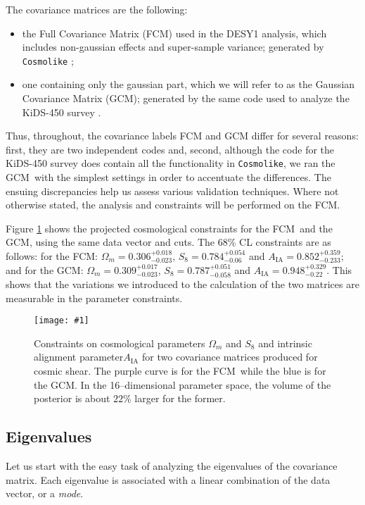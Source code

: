 \documentclass[twocolumn,nofootinbib]{\docclass}
\newcommand{\sfig}[2]{
	\texttt{[image: \#1]}
}
\newcommand{\Sfig}[3]{
	\begin{figure}[#1]
		\sfig{../figures/#2.pdf}{\columnwidth}
		\caption{#3}
		\label{fig:#2}
	\end{figure}
}
\newcommand{\rf}[1]{Figure \ref{fig:#1}}
\newcommand\full{the FCM}
\newcommand\gaussian{the GCM}
\begin{document}
The covariance matrices are the following:
\begin{itemize}
	\item the Full Covariance Matrix (FCM) used in the DESY1 analysis, which includes non-gaussian effects and super-sample variance; generated by \texttt{Cosmolike} \cite{Krause:2016jvl};
	\item one containing only the gaussian part, which we will refer to as the Gaussian Covariance Matrix (GCM); generated by the same code used to analyze the KiDS-450 survey \cite{Kohlinger:2017sxk, Joachimi:2020blm}.
\end{itemize}
Thus, throughout, the covariance labels FCM and GCM differ for several reasons: first, they are two independent codes	and, second, although the code for the KiDS-450 survey does contain all the functionality in \texttt{Cosmolike}, we ran \gaussian\ with the simplest settings in order to accentuate the differences. The ensuing discrepancies help us assess various validation techniques. Where not otherwise stated, the analysis and constraints will be performed on \full.

\rf{Y1-constraints_wmS8A} shows the projected cosmological constraints for \full\ and \gaussian, using the same data vector and cuts. The 68\% CL constraints are as follows: for \full: $\Omega_m = 0.306^{+ 0.018}_{- 0.023}$, $S_8 = 0.784^{+ 0.054}_{- 0.06}$ and $A_{\text{IA}} = 0.852^{+ 0.359}_{- 0.233}$; and for \gaussian: $\Omega_m = 0.309^{+ 0.017}_{- 0.023}$, $S_8 = 0.787^{+ 0.051}_{- 0.058}$ and $A_{\text{IA}} = 0.948^{+ 0.329}_{- 0.22}$. This shows that the variations we introduced to the calculation of the two matrices are measurable in the parameter constraints.

\Sfig{thbp}{Y1-constraints_wmS8A}{Constraints on cosmological parameters $\Omega_m$ and $S_8$ and intrinsic alignment parameter$A_{\text{IA}}$ for two covariance matrices produced for cosmic shear. The purple curve is for \full\ while the blue is for \gaussian. In the 16--dimensional parameter space, the volume of the posterior is about $22\%$ larger for the former.}

\subsection{Eigenvalues}
\label{subsec:eigenvalues}

Let us start with the easy task of analyzing the eigenvalues of the covariance matrix. Each eigenvalue is associated with a linear combination of the data vector, or a \emph{mode}.
\end{document}

